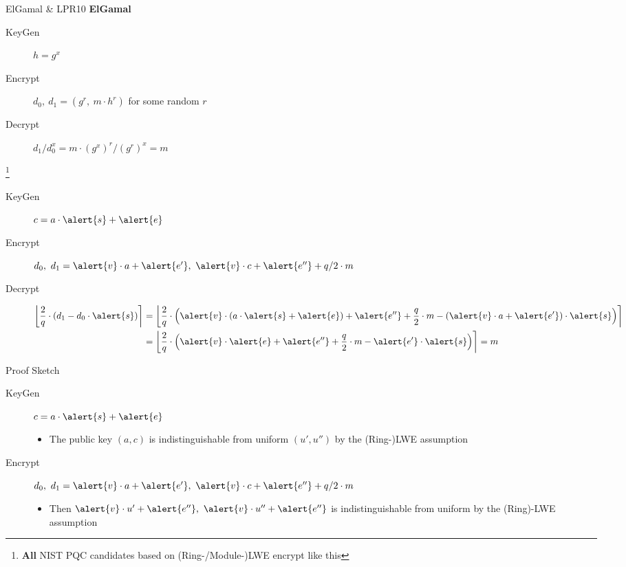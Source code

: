 \documentclass[xcolor=table,10pt,aspectratio=169]{beamer}
\begin{document}
\begin{frame}[label={sec:org2c3980b}]{ElGamal \& LPR10}
\textbf{ElGamal}

\begin{description}
\item[{KeyGen}] \(h = g^{x}\)
\item[{Encrypt}] \(d_{0},\ d_{1} = \left({g^{r},\  m \cdot h^{r}}\right)\) for some random \(r\)
\item[{Decrypt}] \(d_{1} / d_{0}^{x} = m \cdot (g^{x})^{r} / (g^{r})^{x} = m\)
\end{description}

\textbf{\cite{EC:LyuPeiReg10}}\footnote{\textbf{All} NIST PQC candidates based on (Ring-/Module-)LWE encrypt like this}

\begin{description}
\item[{KeyGen}] \(c = a \cdot \alert{s} + \alert{e}\)
\item[{Encrypt}] \(d_{0}, \ d_{1} = \alert{v} \cdot a + \alert{e'},\ \alert{v} \cdot c + \alert{e''} + q/2 \cdot m\)
\item[{Decrypt}] \begin{align*}
\left\lfloor \frac{2}{q} \cdot \left(d_{1} - d_{0} \cdot \alert{s}\right) \right\rceil &= \left\lfloor \frac{2}{q} \cdot \left({\alert{v} \cdot (a \cdot \alert{s} + \alert{e}) + \alert{e''} + \frac{q}{2} \cdot m - \left(\alert{v} \cdot a + \alert{e'}\right) \cdot \alert{s}}\right) \right\rceil\\
&= \left\lfloor \frac{2}{q} \cdot \left({\alert{v} \cdot \alert{e} + \alert{e''} + \frac{q}{2} \cdot m - \alert{e'} \cdot \alert{s}}\right) \right\rceil = m\\
\end{align*}
\end{description}
\end{frame}


\begin{frame}[label={sec:org1158524}]{Proof Sketch}
\begin{description}
\item[{KeyGen}] \(c = a \cdot \alert{s} + \alert{e}\)
\begin{itemize}
\item The public key \((a,c)\) is indistinguishable from uniform \((u', u'')\) by the (Ring-)LWE assumption
\end{itemize}

\item[{Encrypt}] \(d_{0}, \ d_{1} = \alert{v} \cdot a + \alert{e'},\ \alert{v} \cdot c + \alert{e''} + q/2 \cdot m\)
\begin{itemize}
\item Then \(\alert{v} \cdot u' + \alert{e''},\ \alert{v} \cdot u'' + \alert{e''}\) is indistinguishable from uniform by the (Ring)-LWE assumption
\end{itemize}
\end{description}
\end{frame}
\end{document}
